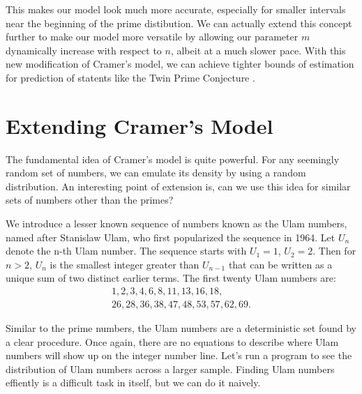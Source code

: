 \documentclass[conference]{IEEEtran}
\begin{document}
This makes our model look much more accurate, especially for smaller intervals near the beginning of the prime distibution. We can actually extend this concept further to make our model more versatile by allowing our parameter $m$ dynamically increase with respect to $n$, albeit at a much slower pace. With this new modification of Cramer's model, we can achieve tighter bounds of estimation for prediction of statents like the Twin Prime Conjecture \cite{b1}. 


\section{Extending Cramer's Model}

The fundamental idea of Cramer's model is quite powerful. For any seemingly random set of numbers, we can emulate its density by using a random distribution. An interesting point of extension is, can we use this idea for similar sets of numbers other than the primes?

We introduce a lesser known sequence of numbers known as the Ulam numbers, named after Stanislaw Ulam, who first popularized the sequence in 1964. Let $U_n$ denote the n-th Ulam number. The sequence starts with $U_1 = 1$, $U_2 = 2$. Then for $n > 2$, $U_n$ is the smallest integer greater than $U_{n - 1}$ that can be written as a unique sum of two distinct earlier terms. The first twenty Ulam numbers are:
\begin{gather*}
  1, 2, 3, 4, 6, 8, 11, 13, 16, 18, \\
  26, 28, 36, 38, 47, 48, 53, 57, 62, 69.
\end{gather*}

Similar to the prime numbers, the Ulam numbers are a deterministic set found by a clear procedure. Once again, there are no equations to describe where Ulam numbers will show up on the integer number line. Let's run a program to see the distribution of Ulam numbers across a larger sample. Finding Ulam numbers effiently is a difficult task in itself, but we can do it naively. 
\end{document}
